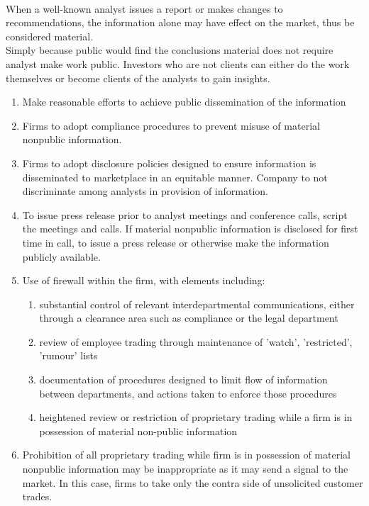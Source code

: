 \begin{remark} \\
When a well-known analyst issues a report or makes changes to recommendations, the information alone may have effect on the market, thus be considered material.\\
Simply because public would find the conclusions material does not require analyst make work public. Investors who are not clients can either do the work themselves or become clients of the analysts to gain insights.
\end{remark}

\begin{remark} 
\begin{enumerate}[label=\roman*.]
\setlength{\itemsep}{0pt}
\item Make reasonable efforts to achieve public dissemination of the information
\item Firms to adopt compliance procedures to prevent misuse of material nonpublic information.
\item Firms to adopt disclosure policies designed to ensure information is disseminated to marketplace in an equitable manner. Company to not discriminate among analysts in provision of information.
\item To issue press release prior to analyst meetings and conference calls, script the meetings and calls. If material nonpublic information is disclosed for first time in call, to issue a press release or otherwise make the information publicly available.
\item Use of firewall within the firm, with elements including:
\begin{enumerate}[label=\arabic*.]
\setlength{\itemsep}{0pt}
\item substantial control of relevant interdepartmental communications, either through a clearance area such as compliance or the legal department
\item review of employee trading through maintenance of 'watch', 'restricted', 'rumour' lists
\item documentation of procedures designed to limit flow of information between departments, and actions taken to enforce those procedures
\item heightened review or restriction of proprietary trading while a firm is in possession of material non-public information
\end{enumerate}
\item Prohibition of all proprietary trading while firm is in possession of material nonpublic information may be inappropriate as it may send a signal to the market. In this case, firms to take only the contra side of unsolicited customer trades.
\end{enumerate}
\end{remark}

